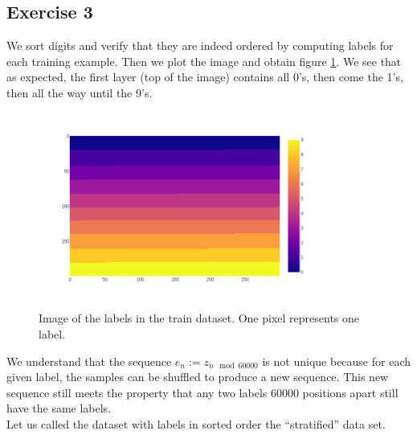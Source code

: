 \documentclass[12pt]{article}
\begin{document}
\subsection{Exercise 3}
We sort digits and verify that they are indeed ordered by computing labels for each training example. Then we plot the image and obtain figure \ref{fig: sorted digits}. We see that as expected, the first layer (top of the image) contains all 0's, then come the 1's, then all the way until the 9's. \\
\begin{figure}[ht]
  \centering
  \includegraphics[width=0.8\textwidth]{images/sorted-digits.png}
  \caption{Image of the labels in the train dataset. One pixel represents one label.}
  \label{fig: sorted digits}
\end{figure}
We understand that the sequence $e_n := z_{n \mod 60000}$  is not unique because for each given label, the samples can be shuffled to produce a new sequence. This new sequence still meets the property that any two labels 60000 positions apart still have the same labels. \\
Let us called the dataset with labels in sorted order the ``stratified'' data set.
\end{document}
